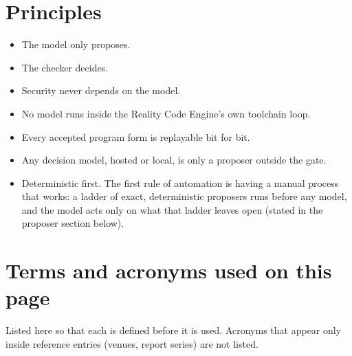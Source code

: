\documentclass[10pt,letterpaper]{article}
\providecommand{\tightlist}{\setlength{\itemsep}{1pt}\setlength{\parskip}{0pt}}
\begin{document}
\section{Principles}\label{principles}

\begin{itemize}
\tightlist
\item
  The model only proposes.
\item
  The checker decides.
\item
  Security never depends on the model.
\item
  No model runs inside the Reality Code Engine's own toolchain loop.
\item
  Every accepted program form is replayable bit for bit.
\item
  Any decision model, hosted or local, is only a proposer outside the
  gate.
\item
  Deterministic first. The first rule of automation is having a manual
  process that works: a ladder of exact, deterministic proposers runs
  before any model, and the model acts only on what that ladder leaves
  open (stated in the proposer section below).
\end{itemize}

\section{Terms and acronyms used on this
page}\label{terms-and-acronyms-used-on-this-page}

Listed here so that each is defined before it is used. Acronyms that
appear only inside reference entries (venues, report series) are not
listed.
\end{document}
